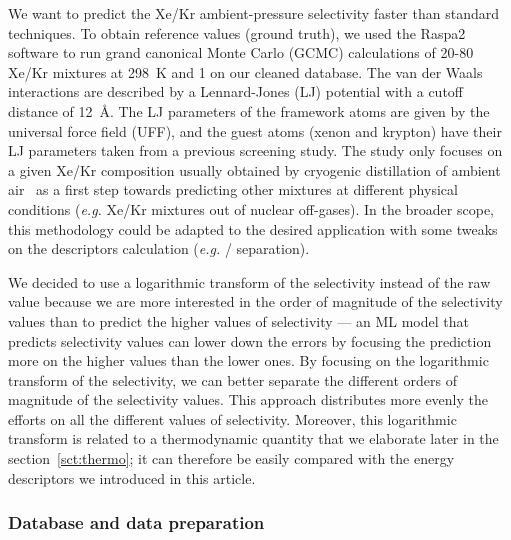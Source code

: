 \documentclass[main]{subfiles}
\begin{document}
We want to predict the Xe/Kr ambient-pressure selectivity faster than standard techniques. To obtain reference values (ground truth), we used the Raspa2 software\autocite{dubbeldam2016} to run grand canonical Monte Carlo (GCMC) calculations of 20-80 Xe/Kr mixtures at \SI{298}{\kelvin} and \SI{1}{\atm} on our cleaned database. The van der Waals interactions are described by a Lennard-Jones (LJ) potential with a cutoff distance of \SI{12}{\angstrom}. The LJ parameters of the framework atoms are given by the universal force field (UFF),\autocite{rappe1992} and the guest atoms (xenon and krypton) have their LJ parameters taken from a previous screening study.\autocite{Ryan_2010} The study only focuses on a given Xe/Kr composition usually obtained by cryogenic distillation of ambient air~\autocite{kerry2007industrial} as a first step towards predicting other mixtures at different physical conditions (\emph{e.g.} Xe/Kr mixtures out of nuclear off-gases). In the broader scope, this methodology could be adapted to the desired application with some tweaks on the descriptors calculation (\emph{e.g.} / separation).

We decided to use a logarithmic transform of the selectivity instead of the raw value because we are more interested in the order of magnitude of the selectivity values than to predict the higher values of selectivity --- an ML model that predicts selectivity values can lower down the errors by focusing the prediction more on the higher values than the lower ones. By focusing on the logarithmic transform of the selectivity, we can better separate the different orders of magnitude of the selectivity values. This approach distributes more evenly the efforts on all the different values of selectivity. Moreover, this logarithmic transform is related to a thermodynamic quantity that we elaborate later in the section~\ref{sct:thermo}; it can therefore be easily compared with the energy descriptors we introduced in this article.

\subsubsection{Database and data preparation}
\end{document}
